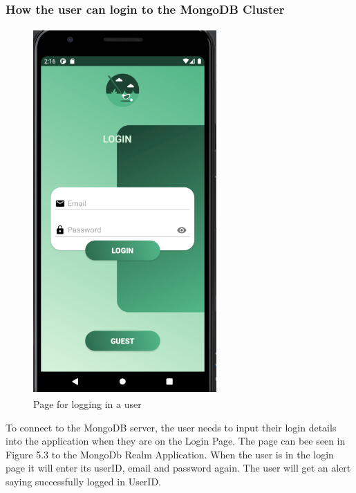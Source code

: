 \subsubsection{How the user can login to the MongoDB Cluster}
\begin{figure}[H]
    \centering
    \includegraphics[width=7cm, height = 14cm]{img/loginPage.PNG}
    \caption{Page for logging in a user}
    \label{fig:altas config}
\end{figure}
To connect to the MongoDB server, the user needs to input their login details into the application when they are on the Login Page. The page can bee seen in Figure 5.3 to the MongoDb Realm Application. When the user is in the login page it will enter its userID, email and password again. The user will get an alert saying successfully logged in UserID.


